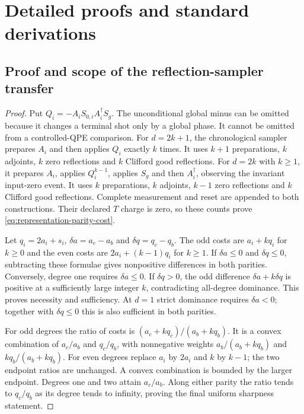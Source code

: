 \documentclass[11pt]{article}
\begin{document}
\appendix
\section{Detailed proofs and standard derivations}
\label{app:main-derivations}

\subsection{Proof and scope of the reflection-sampler transfer}
\label{app:reflection-dominance}

\begin{proof}
Put $Q_i=-A_iS_{0,i}A_i^\dagger S_g$. The unconditional global minus
can be omitted because it changes a terminal shot only by a global
phase. It cannot be omitted from a controlled-QPE comparison. For
$d=2k+1$, the chronological sampler prepares $A_i$ and then applies
$Q_i$ exactly $k$ times. It uses $k+1$ preparations, $k$ adjoints,
$k$ zero reflections and $k$ Clifford good reflections. For $d=2k$
with $k\geq1$, it prepares $A_i$, applies $Q_i^{k-1}$, applies $S_g$
and then $A_i^\dagger$, observing the invariant input-zero event. It
uses $k$ preparations, $k$ adjoints, $k-1$ zero reflections and $k$
Clifford good reflections. Complete measurement and reset are appended
to both constructions. Their declared $T$ charge is zero, so these
counts prove \eqref{eq:representation-parity-cost}.

Let $q_i=2a_i+s_i$, $\delta a=a_c-a_b$ and $\delta q=q_c-q_b$.
The odd costs are $a_i+kq_i$ for $k\geq0$ and the even costs are
$2a_i+(k-1)q_i$ for $k\geq1$. If $\delta a\leq0$ and
$\delta q\leq0$, subtracting these formulae gives nonpositive
differences in both parities. Conversely, degree one requires
$\delta a\leq0$. If $\delta q>0$, the odd difference
$\delta a+k\delta q$ is positive at a sufficiently large integer
$k$, contradicting all-degree dominance. This proves necessity and
sufficiency. At $d=1$ strict dominance requires $\delta a<0$; together
with $\delta q\leq0$ this is also sufficient in both parities.

For odd degrees the ratio of costs is
$(a_c+kq_c)/(a_b+kq_b)$. It is a convex combination of $a_c/a_b$
and $q_c/q_b$, with nonnegative weights
$a_b/(a_b+kq_b)$ and $kq_b/(a_b+kq_b)$. For even degrees replace
$a_i$ by $2a_i$ and $k$ by $k-1$; the two endpoint ratios are
unchanged. A convex combination is bounded by the larger endpoint.
Degrees one and two attain $a_c/a_b$. Along either parity the ratio
tends to $q_c/q_b$ as its degree tends to infinity, proving the final
uniform sharpness statement.
\end{proof}
\end{document}
